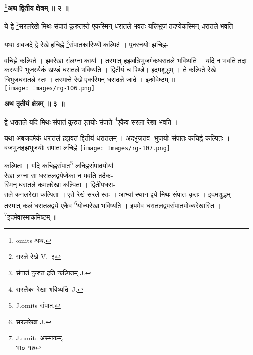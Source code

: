 \documentclass[11pt, openany]{book}
\begin{document}
\newpage
\begin{center}
\textbf{\large \renewcommand{\thefootnote}{१}\footnote{{\en omits} अथ.}अथ द्वितीय क्षेत्रम् ॥ २ ॥}
\end{center}
\vspace{5mm}

{\ab ये द्वे \renewcommand{\thefootnote}{२}\footnote{सरले रेखे {\en V.~३}}सरलरेखे मिथः संपातं कुरुतस्ते एकस्मिन् धरातले
भवतः यत्त्रिभुजं तदप्येकस्मिन् धरातले भवति ।}\\
\vspace{3mm}

 यथा अबजदे द्वे रेखे हचिह्ने \renewcommand{\thefootnote}{3}\footnote{संपातं कुरुत इति कल्पितम् {\en J.}}संपातकारिण्यौ कल्पिते । पुनरनयोः झचिह्न-
 
 \begin{vwcol}[widths={0.7,0.3}, sep=.8cm, rule=0pt] 
वचिह्ने  कल्पिते । झवरेखा संलग्ना कार्या । तस्मात् हझवत्रिभुजमेकधरातले भविष्यति । यदि न भवति तदा कस्यापि भुजस्यैकं खण्डं धरातले भविष्यति । द्वितीयं च पिण्डे। इदमशुद्धम् । ते कल्पिते रेखे त्रिभुजधरातले स्तः । तस्मात्ते रेखे  एकस्मिन् धरातले जाते । इदमेवेष्टम् ॥\\
\noindent \texttt{[image: Images/rg-106.png]}
\end{vwcol}
\vspace{5mm}

\begin{center}
\textbf{\large अथ तृतीयं क्षेत्रम् ॥ ३ ॥}
\end{center}
\vspace{5mm}

{\ab द्वे धरातले यदि मिथः संपातं कुरुत एतयोः संपाते \renewcommand{\thefootnote}{४}\footnote{सरलैका रेखा भविष्यति~{\en J.}}एकैव सरला रेखा भवति ।}\\

 \begin{vwcol}[widths={0.65,0.35}, sep=.8cm, rule=0pt] 
 यथा अबजदमेकं धरातलं हझवतं द्वितीयं धरातलम् । अदभुजतव-
 भुजयोः संपातः कचिह्ने कल्पितः । बजभुजहझभुजयोः संपातः 
लचिह्ने 
\noindent \texttt{[image: Images/rg-107.png]}
\end{vwcol}
\vspace{-7mm}

\noindent कल्पितः । यदि कचिह्नसंपात\renewcommand{\thefootnote}{५}\footnote{{\en J.omits } संपात, }
लचिह्नसंपातयोर्या \\
रेखा लग्ना 
सा धरातलद्वयेप्येका न भवति तदैक-\\
स्मिन् धरातले कमलरेखा कल्पिता । द्वितीयधरा-\\
तले कनलरेखा कल्पिता । एते रेखे सरले स्तः । आभ्यां स्थान-द्वये मिथः संपातः कृतः । इदमशुद्धम् । तस्मात् कलं धरातलद्वये एकैव
\renewcommand{\thefootnote}{६}\footnote{सरलरेखा {\en J.}}योज्यरेखा भविष्यति । इयमेव धरातलद्वयसंपातयोज्यरेखास्ति । \renewcommand{\thefootnote}{७}\footnote{{\en J.omits} अस्माकम्.\\
 भा० १७}इदमेवास्माकमिष्टम् ॥
\end{document}
